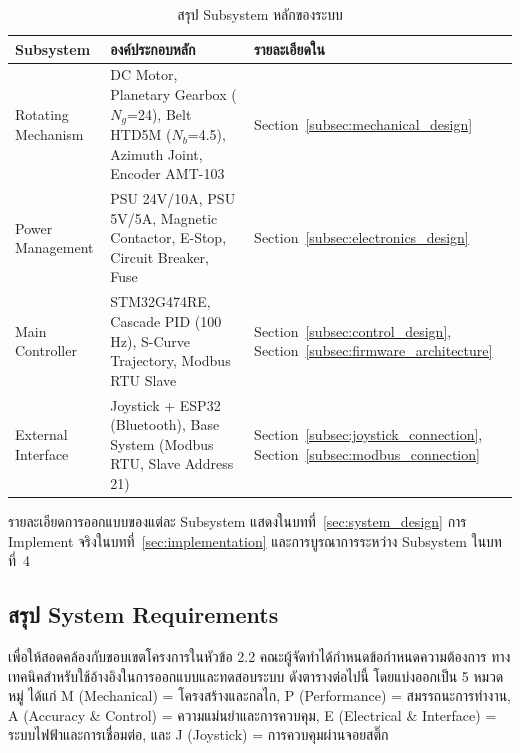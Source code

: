 \begin{table}[H]
  \centering
  \caption{สรุป Subsystem หลักของระบบ}
  \label{tab:subsystem_summary}
  \begin{tabular}{lp{4.2cm}p{4cm}}
    \toprule
    Subsystem & องค์ประกอบหลัก & รายละเอียดใน \\
    \midrule
    Rotating Mechanism
      & DC Motor, Planetary Gearbox ($N_g$=24),
        Belt HTD5M ($N_b$=4.5),
        Azimuth Joint, Encoder AMT-103
      & Section~\ref{subsec:mechanical_design} \\
    Power Management
      & PSU 24V/10A, PSU 5V/5A,
        Magnetic Contactor, E-Stop,
        Circuit Breaker, Fuse
      & Section~\ref{subsec:electronics_design} \\
    Main Controller
      & STM32G474RE, Cascade PID (100\,Hz),
        S-Curve Trajectory,
        Modbus RTU Slave
      & Section~\ref{subsec:control_design},
        Section~\ref{subsec:firmware_architecture} \\
    External Interface
      & Joystick + ESP32 (Bluetooth),
        Base System (Modbus RTU,
        Slave Address 21)
      & Section~\ref{subsec:joystick_connection},
        Section~\ref{subsec:modbus_connection} \\
    \bottomrule
  \end{tabular}
\end{table}

รายละเอียดการออกแบบของแต่ละ Subsystem
แสดงในบทที่~\ref{sec:system_design}
การ Implement จริงในบทที่~\ref{sec:implementation}
และการบูรณาการระหว่าง Subsystem
ในบทที่~4

\subsection{สรุป System Requirements}
\label{subsec:system_requirements}

เพื่อให้สอดคล้องกับขอบเขตโครงการในหัวข้อ 2.2 คณะผู้จัดทำได้กำหนดข้อกำหนดความต้องการ
ทางเทคนิคสำหรับใช้อ้างอิงในการออกแบบและทดสอบระบบ ดังตารางต่อไปนี้
โดยแบ่งออกเป็น 5 หมวดหมู่ ได้แก่
M (Mechanical) = โครงสร้างและกลไก,
P (Performance) = สมรรถนะการทำงาน,
A (Accuracy \& Control) = ความแม่นยำและการควบคุม,
E (Electrical \& Interface) = ระบบไฟฟ้าและการเชื่อมต่อ, และ
J (Joystick) = การควบคุมผ่านจอยสติ๊ก

